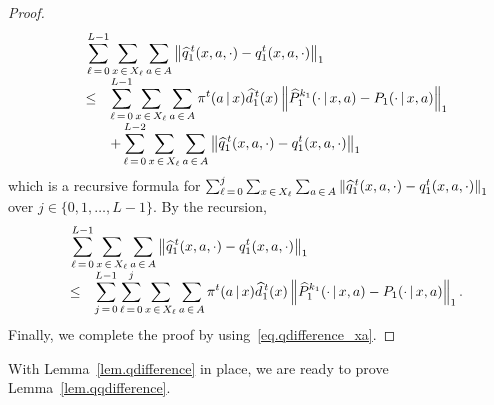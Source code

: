 \documentclass[12pt, final]{l4dc2023}
\begin{document}
\begin{proof}
\begin{equation}
\begin{array}{rcl}
	&& \!\!\!\! \!\!\!\! \!\!
	\displaystyle
	\sum_{\ell\,=\,0}^{L-1}\sum_{x\,\in\,X_\ell}\sum_{a\,\in\,A}\norm{ \hat q_1^{\,t} (x,a,\cdot)- q_1^t (x,a,\cdot)}_1
	\\[0.2cm]
	&\leq&\displaystyle \sum_{\ell\,=\,0}^{L-1}\sum_{x\,\in\,X_\ell}\sum_{a\,\in\,A} \pi^t(a\,\vert\,x) \hat d_1^{\,t}(x) \norm{ \hat P_1^{k_1}(\cdot\,\vert\,x,a)-  P_1(\cdot\,\vert\,x,a) }_1
	\\[0.2cm]
	&&\displaystyle+ \sum_{\ell\,=\,0}^{L-2}\sum_{x\,\in\,X_{\ell}}\sum_{a\,\in\, A}  \norm{ \hat q_1^{\,t} (x,a,\cdot) - q_1^t (x,a,\cdot) }_1
	\end{array}
	\end{equation}
	which is a recursive formula for $\sum_{\ell\,=\,0}^{j}\sum_{x\,\in\,X_{\ell}}\sum_{a\,\in\, A}  \left\|{ \widehat q_1^{\,t} (x,a,\cdot) - q_1^t (x,a,\cdot) }\right\|_1$ over $j\in\{ 0,1,\ldots,L-1 \}$. By the recursion,
	\[
	\begin{array}{rcl}
	&&\!\!\!\! \!\!\!\! \!\!
	\displaystyle
	\sum_{\ell\,=\,0}^{L-1}\sum_{x\,\in\,X_\ell}\sum_{a\,\in\,A}\norm{ \hat q_1^{\,t} (x,a,\cdot)- q_1^t (x,a,\cdot)}_1
	\\[0.2cm]
	&\leq&\displaystyle\sum_{j\,=\,0}^{L-1} \sum_{\ell\,=\,0}^{j}\sum_{x\,\in\,X_\ell}\sum_{a\,\in\,A} \pi^t(a\,\vert\,x) \hat d_1^{\,t} (x) \norm{ \hat P_1^{k_1}(\cdot\,\vert\,x,a)-  P_1(\cdot\,\vert\,x,a) }_1.
	\end{array}
	\]
	Finally, we complete the proof by using~\eqref{eq.qdifference_xa}.
\end{proof}

With Lemma~\ref{lem.qdifference} in place, we are ready to prove Lemma~\ref{lem.qqdifference}.
\end{document}
